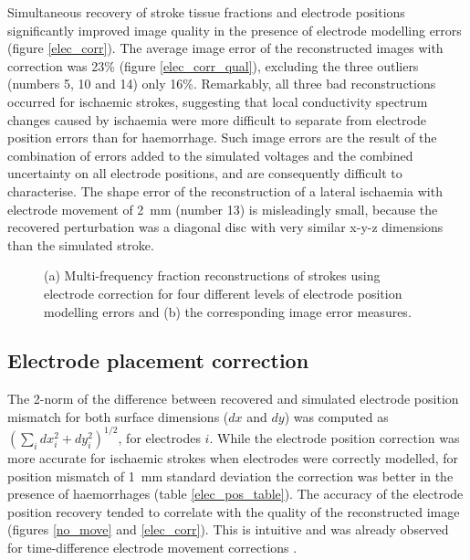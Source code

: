 Simultaneous recovery of stroke tissue fractions and electrode positions significantly improved image quality in the presence of electrode modelling errors (figure \ref{elec_corr}). The average image error of the reconstructed images with correction was 23\% (figure \ref{elec_corr_qual}), excluding the three outliers (numbers 5, 10 and 14) only 16\%. Remarkably, all three bad reconstructions occurred for ischaemic strokes, suggesting that local conductivity spectrum changes caused by ischaemia were more difficult to separate from electrode position errors than for haemorrhage. Such image errors are the result of the combination of errors added to the simulated voltages and the combined uncertainty on all electrode positions, and are consequently difficult to characterise. The shape error of the reconstruction of a lateral ischaemia with electrode movement of \SI{2}{\milli\metre} (number 13) is misleadingly small, because the recovered perturbation was a diagonal disc with very similar x-y-z dimensions than the simulated stroke.

\begin{figure}[htbp]
\centering
	\hfil
\caption{(a) Multi-frequency fraction reconstructions of strokes using electrode correction for four different levels of electrode position modelling errors and (b) the corresponding image error measures.}
\end{figure}

\subsection{Electrode placement correction}

The 2-norm of the difference between recovered and simulated electrode position mismatch for both surface dimensions ($dx$ and $dy$) was computed as $\left(\sum_{i} dx_i^2 + dy_i^2\right)^{1/2}$, for electrodes $i$. While the electrode position correction was more accurate for ischaemic strokes when electrodes were correctly modelled, for position mismatch of \SI{1}{\milli\metre} standard deviation the correction was better in the presence of haemorrhages (table \ref{elec_pos_table}). The accuracy of the electrode position recovery tended to correlate with the quality of the reconstructed image (figures \ref{no_move} and \ref{elec_corr}). This is intuitive and was already observed for time-difference electrode movement corrections \citep{Jehl2015b}.

